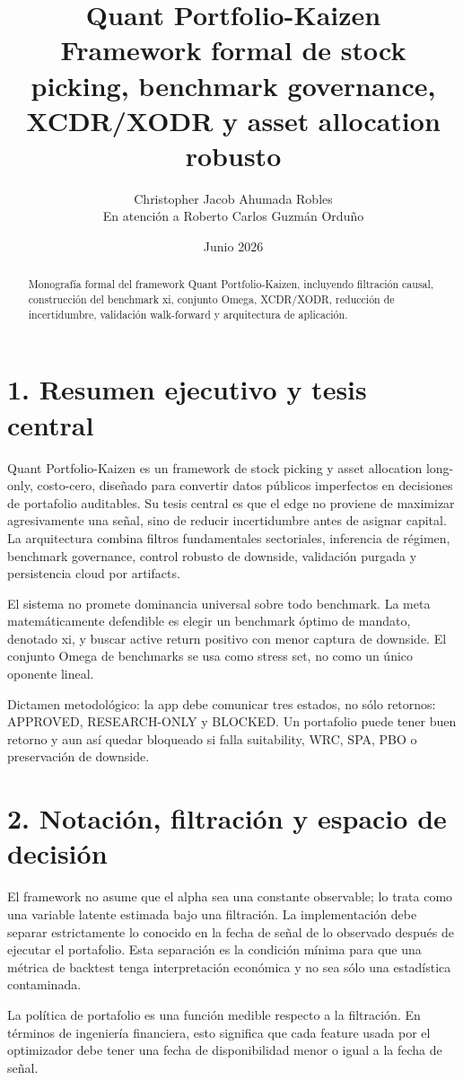 \documentclass[11pt,letterpaper]{article}
\title{\textbf{Quant Portfolio-Kaizen}\\Framework formal de stock picking, benchmark governance, XCDR/XODR y asset allocation robusto}
\author{Christopher Jacob Ahumada Robles\\En atención a Roberto Carlos Guzmán Orduño}
\date{Junio 2026}
\begin{document}
\maketitle
\begin{abstract}
Monografía formal del framework Quant Portfolio-Kaizen, incluyendo filtración causal, construcción del benchmark xi, conjunto Omega, XCDR/XODR, reducción de incertidumbre, validación walk-forward y arquitectura de aplicación.
\end{abstract}
\tableofcontents
\newpage
\section{1. Resumen ejecutivo y tesis central}
Quant Portfolio-Kaizen es un framework de stock picking y asset allocation long-only, costo-cero, diseñado para convertir datos públicos imperfectos en decisiones de portafolio auditables. Su tesis central es que el edge no proviene de maximizar agresivamente una señal, sino de reducir incertidumbre antes de asignar capital. La arquitectura combina filtros fundamentales sectoriales, inferencia de régimen, benchmark governance, control robusto de downside, validación purgada y persistencia cloud por artifacts.

El sistema no promete dominancia universal sobre todo benchmark. La meta matemáticamente defendible es elegir un benchmark óptimo de mandato, denotado xi, y buscar active return positivo con menor captura de downside. El conjunto Omega de benchmarks se usa como stress set, no como un único oponente lineal.

Dictamen metodológico: la app debe comunicar tres estados, no sólo retornos: APPROVED, RESEARCH-ONLY y BLOCKED. Un portafolio puede tener buen retorno y aun así quedar bloqueado si falla suitability, WRC, SPA, PBO o preservación de downside.

\section{2. Notación, filtración y espacio de decisión}
El framework no asume que el alpha sea una constante observable; lo trata como una variable latente estimada bajo una filtración. La implementación debe separar estrictamente lo conocido en la fecha de señal de lo observado después de ejecutar el portafolio. Esta separación es la condición mínima para que una métrica de backtest tenga interpretación económica y no sea sólo una estadística contaminada.

La política de portafolio es una función medible respecto a la filtración. En términos de ingeniería financiera, esto significa que cada feature usada por el optimizador debe tener una fecha de disponibilidad menor o igual a la fecha de señal.
\end{document}
